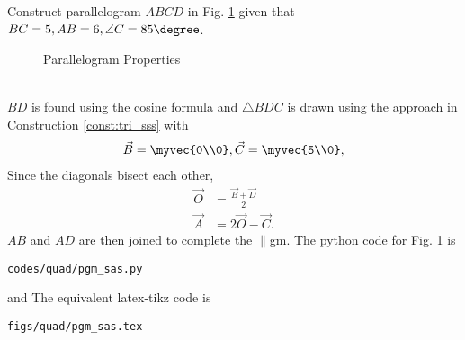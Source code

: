 %

\item Construct parallelogram $ABCD$ 	in Fig. \ref{fig:pgm_sas}	
given that  $BC = 5, AB = 6, \angle C = 85 \degree$.
\begin{figure}[!ht]
	\begin{center}
		\resizebox{\columnwidth}{!}{}
	\end{center}
	\caption{Parallelogram Properties}
	\label{fig:pgm_sas}	
\end{figure}
%
\\
\solution $BD$ is found using the cosine formula and $\triangle BDC$ is drawn using the approach in Construction \ref{const:tri_sss} with 
%
\begin{align}
\vec{B} = \myvec{0\\0},
\vec{C} = \myvec{5\\0},
\end{align}
%
Since the diagonals bisect each other, 
%
\begin{align}
\vec{O} &= \frac{\vec{B}+\vec{D}}{2}
\\
\vec{A} &= 2\vec{O} - \vec{C}.
\end{align}
%
$AB$ and $AD$ are then joined to complete the $\parallel$gm.
The python code for  Fig. \ref{fig:pgm_sas} is
\begin{lstlisting}
codes/quad/pgm_sas.py
\end{lstlisting}
%
and 
The equivalent latex-tikz code is
%
\begin{lstlisting}
figs/quad/pgm_sas.tex
\end{lstlisting}
%

